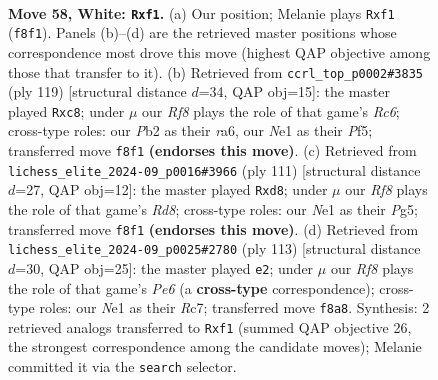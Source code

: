 \documentclass[11pt]{article}
\begin{document}
\clearpage

\begin{figure}[p]\centering
\begin{subfigure}{0.46\textwidth}\centering
\resizebox{\linewidth}{!}{%
\newchessgame
\chessboard[
  setfen={5R1R/8/4k3/2p4P/8/8/1P6/3KNq1r w - - 2 58},
  showmover=false,
  pgfstyle=straightmove, color=movearrow, markmove={f8-f1}
]}
\caption{}
\end{subfigure}\hfill
\begin{subfigure}{0.46\textwidth}\centering
\resizebox{\linewidth}{!}{%
\newchessgame
\chessboard[
  setfen={2Q3R1/5k2/R7/5p2/8/2r5/2r5/3K4 b - - 0 60},
  showmover=false,
  pgfstyle=straightmove, color=movearrow, markmove={c3-c8}
]}
\caption{}
\end{subfigure}
\\[4pt]
\begin{subfigure}{0.46\textwidth}\centering
\resizebox{\linewidth}{!}{%
\newchessgame
\chessboard[
  setfen={2RQ4/8/4k3/2P3p1/8/8/5K2/3rr3 b - - 0 56},
  showmover=false,
  pgfstyle=straightmove, color=movearrow, markmove={d1-d8}
]}
\caption{}
\end{subfigure}\hfill
\begin{subfigure}{0.46\textwidth}\centering
\resizebox{\linewidth}{!}{%
\newchessgame
\chessboard[
  setfen={2k5/2r5/1Qn5/8/6P1/4p3/6K1/1R6 b - - 0 57},
  showmover=false,
  pgfstyle=straightmove, color=movearrow, markmove={e3-e2}
]}
\caption{}
\end{subfigure}
\caption{\textbf{Move 58, White: \texttt{Rxf1}.} (a) Our position; Melanie plays \texttt{Rxf1} (\texttt{f8f1}). Panels (b)--(d) are the retrieved master positions whose correspondence most drove this move (highest QAP objective among those that transfer to it). (b) Retrieved from \texttt{ccrl\_top\_p0002\#3835} (ply 119) [structural distance $d$=34, QAP obj=15]: the master played \texttt{Rxc8}; under $\mu$ our \emph{Rf8} plays the role of that game's \emph{Rc6}; cross-type roles: our \emph{P}b2 as their \emph{r}a6, our \emph{N}e1 as their \emph{P}f5; transferred move \texttt{f8f1} \textbf{(endorses this move)}. (c) Retrieved from \texttt{lichess\_elite\_2024-09\_p0016\#3966} (ply 111) [structural distance $d$=27, QAP obj=12]: the master played \texttt{Rxd8}; under $\mu$ our \emph{Rf8} plays the role of that game's \emph{Rd8}; cross-type roles: our \emph{N}e1 as their \emph{P}g5; transferred move \texttt{f8f1} \textbf{(endorses this move)}. (d) Retrieved from \texttt{lichess\_elite\_2024-09\_p0025\#2780} (ply 113) [structural distance $d$=30, QAP obj=25]: the master played \texttt{e2}; under $\mu$ our \emph{Rf8} plays the role of that game's \emph{Pe6} (a \textbf{cross-type} correspondence); cross-type roles: our \emph{N}e1 as their \emph{R}c7; transferred move \texttt{f8a8}. Synthesis: 2 retrieved analogs transferred to \texttt{Rxf1} (summed QAP objective 26, the strongest correspondence among the candidate moves); Melanie committed it via the \texttt{search} selector.}
\label{fig:thought-m114}
\end{figure}
\end{document}
